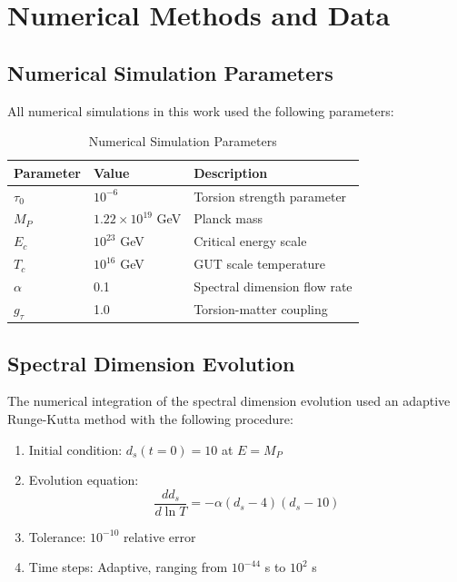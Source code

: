 \chapter{Numerical Methods and Data}
\label{app:numerical}

\section{Numerical Simulation Parameters}

All numerical simulations in this work used the following parameters:

\begin{table}[htbp]
\centering
\caption{Numerical Simulation Parameters}
\label{tab:num_params}
\begin{tabular}{lll}
\toprule
\textbf{Parameter} & \textbf{Value} & \textbf{Description} \\
\midrule
$\tau_0$ & $10^{-6}$ & Torsion strength parameter \\
$M_P$ & $1.22 \times 10^{19}$ GeV & Planck mass \\
$E_c$ & $10^{23}$ GeV & Critical energy scale \\
$T_c$ & $10^{16}$ GeV & GUT scale temperature \\
$\alpha$ & 0.1 & Spectral dimension flow rate \\
$g_\tau$ & 1.0 & Torsion-matter coupling \\
\bottomrule
\end{tabular}
\end{table}

\section{Spectral Dimension Evolution}

The numerical integration of the spectral dimension evolution used an adaptive Runge-Kutta method with the following procedure:

\begin{enumerate}
    \item Initial condition: $d_s(t=0) = 10$ at $E = M_P$
    \item Evolution equation:
    \begin{equation}
        \frac{dd_s}{d\ln T} = -\alpha(d_s - 4)(d_s - 10)
    \end{equation}
    
    \item Tolerance: $10^{-10}$ relative error
    \item Time steps: Adaptive, ranging from $10^{-44}$ s to $10^{2}$ s
\end{enumerate}

